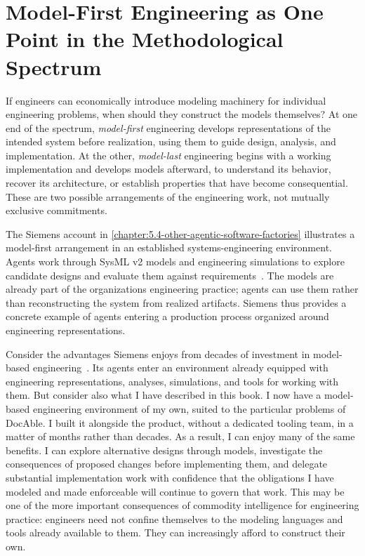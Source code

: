 \section{Model-First Engineering as One Point in the Methodological Spectrum}\label{heading:model-first-engineering-as-one-point-in-the-methodological-spectrum}

If engineers can economically introduce modeling machinery for individual engineering problems, when should they construct the models themselves? At one end of the spectrum, \emph{model-first} engineering develops representations of the intended system before realization, using them to guide design, analysis, and implementation. At the other, \emph{model-last} engineering begins with a working implementation and develops models afterward, to understand its behavior, recover its architecture, or establish properties that have become consequential. These are two possible arrangements of the engineering work, not mutually exclusive commitments.

The Siemens account in \autoref{chapter:5.4-other-agentic-software-factories} illustrates a model-first arrangement in an established systems-engineering environment. Agents work through SysML v2 models and engineering simulations to explore candidate designs and evaluate them against requirements~\citep{liu2024agentstudio}. The models are already part of the organization\textquotesingle s engineering practice; agents can use them rather than reconstructing the system from realized artifacts. Siemens thus provides a concrete example of agents entering a production process organized around engineering representations.

Consider the advantages Siemens enjoys from decades of investment in model-based engineering~\citep{mathieu2020amesim}. Its agents enter an environment already equipped with engineering representations, analyses, simulations, and tools for working with them. But consider also what I have described in this book. I now have a model-based engineering environment of my own, suited to the particular problems of DocAble. I built it alongside the product, without a dedicated tooling team, in a matter of months rather than decades. As a result, I can enjoy many of the same benefits. I can explore alternative designs through models, investigate the consequences of proposed changes before implementing them, and delegate substantial implementation work with confidence that the obligations I have modeled and made enforceable will continue to govern that work. This may be one of the more important consequences of commodity intelligence for engineering practice: engineers need not confine themselves to the modeling languages and tools already available to them. They can increasingly afford to construct their own.

